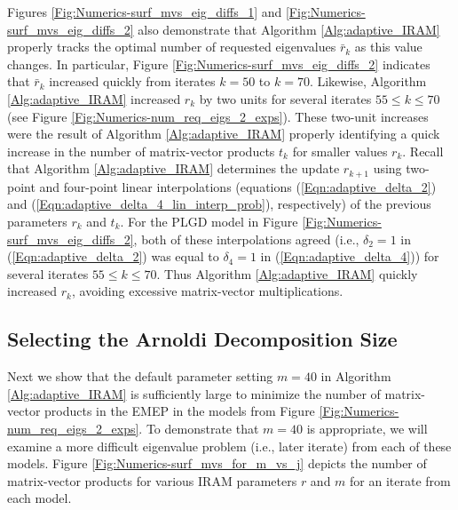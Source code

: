 Figures \ref{Fig:Numerics-surf_mvs_eig_diffs_1} and \ref{Fig:Numerics-surf_mvs_eig_diffs_2} also demonstrate that Algorithm \ref{Alg:adaptive_IRAM} properly tracks the optimal number of requested eigenvalues $\bar{r}_k$ as this value changes.
In particular, Figure \ref{Fig:Numerics-surf_mvs_eig_diffs_2} indicates that $\bar{r}_k$ increased quickly from iterates $k = 50$ to $k = 70$.
Likewise, Algorithm \ref{Alg:adaptive_IRAM} increased $r_k$ by two units for several iterates $55 \leq k \leq 70$ (see Figure \ref{Fig:Numerics-num_req_eigs_2_exps}).
These two-unit increases were the result of Algorithm \ref{Alg:adaptive_IRAM} properly identifying a quick increase in the number of matrix-vector products $t_k$ for smaller values $r_k$.
Recall that Algorithm \ref{Alg:adaptive_IRAM} determines the update $r_{k+1}$ using two-point and four-point linear interpolations (equations (\ref{Eqn:adaptive_delta_2}) and (\ref{Eqn:adaptive_delta_4_lin_interp_prob}), respectively) of the previous parameters $r_k$ and $t_k$.
For the PLGD model in Figure \ref{Fig:Numerics-surf_mvs_eig_diffs_2}, both of these interpolations agreed (i.e., $\delta_2=1$ in (\ref{Eqn:adaptive_delta_2}) was equal to $\delta_4=1$ in (\ref{Eqn:adaptive_delta_4})) for several iterates $55 \leq k \leq 70$.
Thus Algorithm \ref{Alg:adaptive_IRAM} quickly increased $r_k$, avoiding excessive matrix-vector multiplications.







\subsection{Selecting the Arnoldi Decomposition Size}		\label{Subsubsec:evol_mats-default_Arnoldi_decomp_size}



Next we show that the default parameter setting $m = 40$ in Algorithm \ref{Alg:adaptive_IRAM} is sufficiently large to minimize the number of matrix-vector products in the EMEP in the models from Figure \ref{Fig:Numerics-num_req_eigs_2_exps}.
To demonstrate that $m=40$ is appropriate, we will examine a more difficult eigenvalue problem (i.e., later iterate) from each of these models.
Figure \ref{Fig:Numerics-surf_mvs_for_m_vs_j} depicts the number of matrix-vector products for various IRAM parameters $r$ and $m$ for an iterate from each model.



